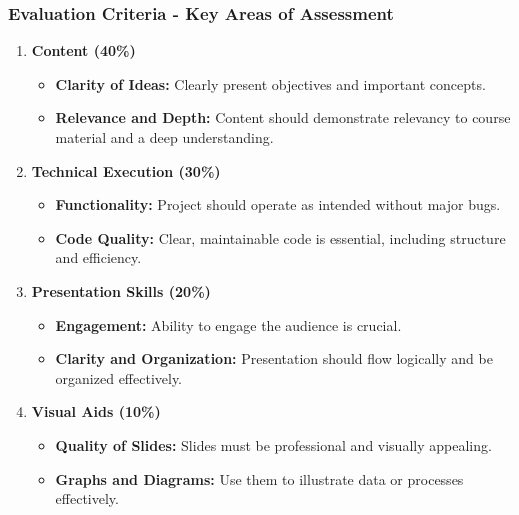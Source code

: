 \documentclass[aspectratio=169]{beamer}
\begin{document}
\begin{frame}[fragile]
    \frametitle{Evaluation Criteria - Key Areas of Assessment}
    \begin{enumerate}
        \item \textbf{Content (40\%)}
        \begin{itemize}
            \item \textbf{Clarity of Ideas:} Clearly present objectives and important concepts.
            \item \textbf{Relevance and Depth:} Content should demonstrate relevancy to course material and a deep understanding.
        \end{itemize}
        
        \item \textbf{Technical Execution (30\%)}
        \begin{itemize}
            \item \textbf{Functionality:} Project should operate as intended without major bugs.
            \item \textbf{Code Quality:} Clear, maintainable code is essential, including structure and efficiency.
        \end{itemize}
        
        \item \textbf{Presentation Skills (20\%)}
        \begin{itemize}
            \item \textbf{Engagement:} Ability to engage the audience is crucial.
            \item \textbf{Clarity and Organization:} Presentation should flow logically and be organized effectively.
        \end{itemize}
        
        \item \textbf{Visual Aids (10\%)}
        \begin{itemize}
            \item \textbf{Quality of Slides:} Slides must be professional and visually appealing.
            \item \textbf{Graphs and Diagrams:} Use them to illustrate data or processes effectively.
        \end{itemize}
    \end{enumerate}
\end{frame}
\end{document}
